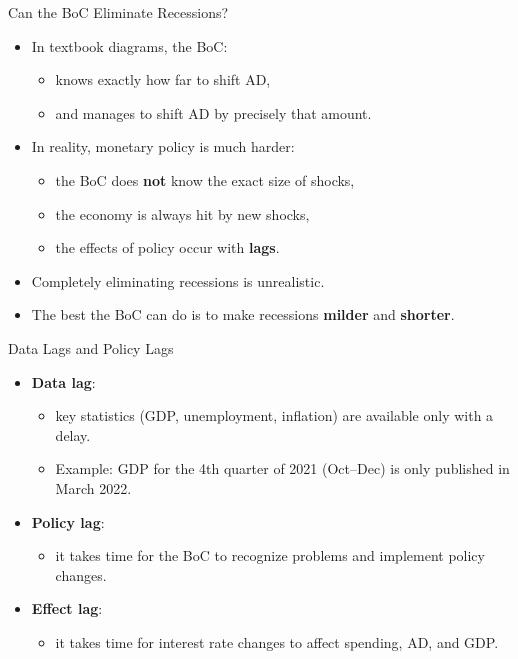 \documentclass[aspectratio=169]{beamer}
\begin{document}
\begin{frame}{Can the BoC Eliminate Recessions?}
\transfade
\begin{itemize}
  \item In textbook diagrams, the BoC:
  \begin{itemize}
    \item knows exactly how far to shift AD,
    \item and manages to shift AD by precisely that amount.
  \end{itemize}
  \item In reality, monetary policy is much harder:
  \begin{itemize}
    \item the BoC does \textbf{not} know the exact size of shocks,
    \item the economy is always hit by new shocks,
    \item the effects of policy occur with \textbf{lags}.
  \end{itemize}
  \item Completely eliminating recessions is unrealistic.
  \item The best the BoC can do is to make recessions \textbf{milder} and \textbf{shorter}.
\end{itemize}
\end{frame}

\begin{frame}{Data Lags and Policy Lags}
\transfade
\begin{itemize}
  \item \textbf{Data lag}:
  \begin{itemize}
    \item key statistics (GDP, unemployment, inflation) are available only with a delay.
    \item Example: GDP for the 4th quarter of 2021 (Oct–Dec) is only published in March 2022.
  \end{itemize}
  \item \textbf{Policy lag}:
  \begin{itemize}
    \item it takes time for the BoC to recognize problems and implement policy changes.
  \end{itemize}
  \item \textbf{Effect lag}:
  \begin{itemize}
    \item it takes time for interest rate changes to affect spending, AD, and GDP.
  \end{itemize}
\end{itemize}
\end{frame}
\end{document}
